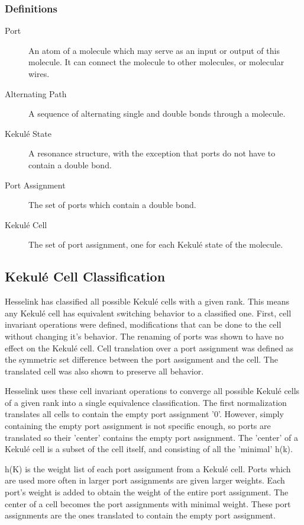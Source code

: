 \documentclass[12pt]{article}
\begin{document}
\subsubsection{Definitions}

\begin{description}
\item[Port] An atom of a molecule which may serve as an input or output of this molecule. It can connect the molecule to other molecules, or molecular wires.
\item[Alternating Path] A sequence of alternating single and double bonds through a molecule.
\item[Kekul\'e State] A resonance structure, with the exception that ports do not have to contain a double bond.
\item[Port Assignment] The set of ports which contain a double bond.
\item[Kekul\'e Cell] The set of port assignment, one for each Kekul\'e state of the molecule.
\end{description}

\subsection{Kekul\'e Cell Classification}

Hesselink \cite{H13} has classified all possible Kekul\'e cells with a given rank. This means any Kekul\'e cell has equivalent switching behavior to a classified one. First, cell invariant operations were defined, modifications that can be done to the cell without changing it's behavior. The renaming of ports was shown to have no effect on the Kekul\'e cell. Cell translation over a port assignment was defined as the symmetric set difference between the port assignment and the cell. The translated cell was also shown to preserve all behavior. 

Hesselink uses these cell invariant operations to converge all possible Kekul\'e cells of a given rank into a single equivalence classification. The first normalization translates all cells to contain the empty port assignment '0'. However, simply containing the empty port assignment is not specific enough, so ports are translated so their 'center' contains the empty port assignment. The 'center' of a Kekul\'e cell is a subset of the cell itself, and consisting of all the 'minimal' h(k).

h(K) is the weight list of each port assignment from a Kekul\'e cell. Ports which are used more often in larger port assignments are given larger weights. Each port's weight is added to obtain the weight of the entire port assignment. The center of a cell becomes the port assignments with minimal weight. 
These port assignments are the ones translated to contain the empty port assignment. 
\end{document}
